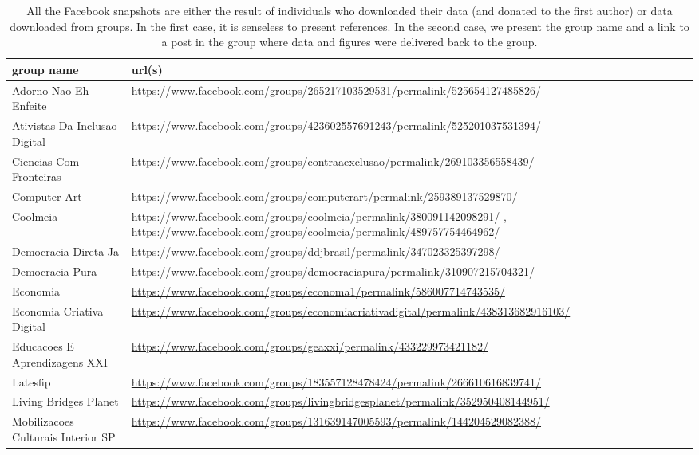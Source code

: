 \begin{table*}[h!]
\begin{center}\scriptsize
\caption{All the Facebook snapshots are either the result of individuals who downloaded
their data (and donated to the first author) or data downloaded from groups.
In the first case, it is senseless to present references. In the second
case, we present the group name and a link to a post in the group where
data and figures were delivered back to the group.}
\begin{tabular}{| l | p{9.9cm} |}\hline
\textbf{group name} & \textbf{url(s)} \\\hline
Adorno Nao Eh Enfeite & \url{https://www.facebook.com/groups/265217103529531/permalink/525654127485826/} \\\hline
Ativistas Da Inclusao Digital & \url{https://www.facebook.com/groups/423602557691243/permalink/525201037531394/} \\\hline
Ciencias Com Fronteiras & \url{https://www.facebook.com/groups/contraaexclusao/permalink/269103356558439/} \\\hline
Computer Art & \url{https://www.facebook.com/groups/computerart/permalink/259389137529870/} \\\hline
Coolmeia &  \url{https://www.facebook.com/groups/coolmeia/permalink/380091142098291/} , \url{https://www.facebook.com/groups/coolmeia/permalink/489757754464962/} \\\hline
Democracia Direta Ja & \url{https://www.facebook.com/groups/ddjbrasil/permalink/347023325397298/} \\\hline
Democracia Pura & \url{https://www.facebook.com/groups/democraciapura/permalink/310907215704321/} \\\hline
Economia & \url{https://www.facebook.com/groups/economa1/permalink/586007714743535/} \\\hline
Economia Criativa Digital & \url{https://www.facebook.com/groups/economiacriativadigital/permalink/438313682916103/} \\\hline
Educacoes E Aprendizagens XXI & \url{https://www.facebook.com/groups/geaxxi/permalink/433229973421182/} \\\hline
Latesfip & \url{https://www.facebook.com/groups/183557128478424/permalink/266610616839741/} \\\hline
Living Bridges Planet & \url{https://www.facebook.com/groups/livingbridgesplanet/permalink/352950408144951/} \\\hline
Mobilizacoes Culturais Interior SP & \url{https://www.facebook.com/groups/131639147005593/permalink/144204529082388/} \\\hline

\end{tabular}
\end{center}
\end{table*}

